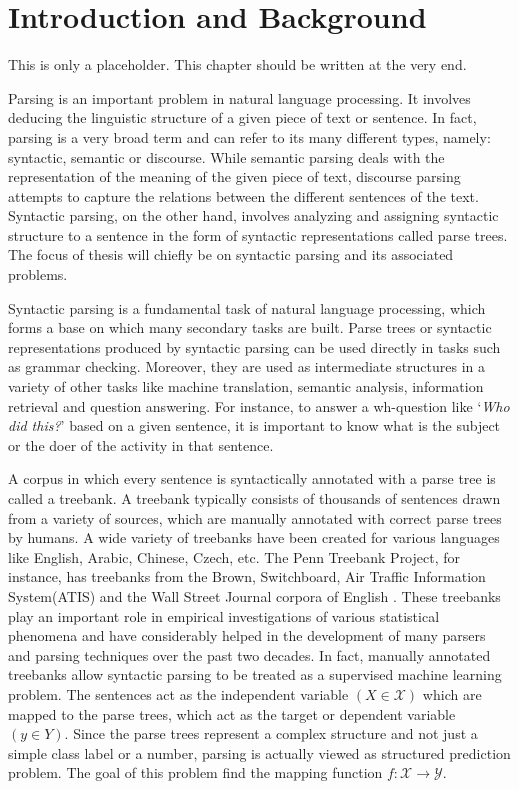 \chapter{Introduction and Background}

This is only a placeholder. This chapter should be written at the very end.

Parsing is an important problem in natural language processing. It involves deducing the linguistic structure of a given piece of text or sentence. In fact, parsing is a very broad term and can refer to its many different types, namely: syntactic, semantic or discourse. While semantic parsing deals with the representation of the meaning of the given piece of text, discourse parsing attempts to capture the relations between the different sentences of the text. Syntactic parsing, on the other hand, involves analyzing and assigning syntactic structure to a sentence in the form of syntactic representations called parse trees. The focus of thesis will chiefly be on syntactic parsing and its associated problems.

Syntactic parsing is a fundamental task of natural language processing, which forms a base on which many secondary tasks are built. Parse trees or syntactic representations produced by syntactic parsing can be used directly in tasks such as grammar checking. Moreover, they are used as intermediate structures in a variety of other tasks like machine translation, semantic analysis, information retrieval and question answering. For instance, to answer a wh-question like `\textit{Who did this?}' based on a given sentence, it is important to know what is the subject or the doer of the activity in that sentence. 

A corpus in which every sentence is syntactically annotated with a parse tree is called a treebank. A treebank typically consists of thousands of sentences drawn from a variety of sources, which are manually annotated with correct parse trees by humans. A wide variety of treebanks have been created for various languages like English, Arabic, Chinese, Czech, etc. The Penn Treebank Project, for instance, has treebanks from the Brown, Switchboard, Air Traffic Information System(ATIS) and the Wall Street Journal corpora of English \cite{jurafsky2014speech}. These treebanks play an important role in empirical investigations of various statistical phenomena and have considerably helped in the development of many parsers and parsing techniques over the past two decades. In fact, manually annotated treebanks allow syntactic parsing to be treated as a supervised machine learning problem. The sentences act as the independent variable $(X \in \mathcal{X})$ which are mapped to the parse trees, which act as the target or dependent variable $(y \in Y)$. Since the parse trees represent a complex structure and not just a simple class label or a number, parsing is actually viewed as structured prediction problem. The goal of this problem find the mapping function $f: \mathcal{X} \rightarrow \mathcal{Y}$.

